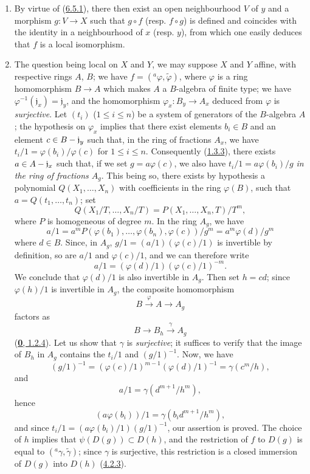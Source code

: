 \begin{enumerate}
  \item[(ii)] By virtue of (\hyperref[I.6.5.1]{6.5.1}), there then exist an
    open neighbourhood $V$ of $y$ and a morphism $g:V\to X$ such that
    $g\circ f$ (resp. $f\circ g$) is defined and coincides with the identity in
    a neighbourhood of $x$ (resp. $y$), from which one easily deduces that $f$
    is a local isomorphism.
  \item[(i)] The question being local on $X$ and $Y$, we may suppose $X$ and
    $Y$ affine, with respective rings $A$, $B$; we have
    $f=({}^a\varphi,\widetilde{\varphi})$, where $\varphi$ is a ring
    homomorphism $B\to A$ which makes $A$ a $B$-algebra of finite type; we have
    $\varphi^{-1}(\mathfrak{j}_x)=\mathfrak{j}_y$, and the homomorphism
    $\varphi_x:B_y\to A_x$ deduced from $\varphi$ is \emph{surjective}. Let $(t_i)$
    ($1\leq i\leq n$) be a system of generators of the $B$-algebra $A$;
    the hypothesis on $\varphi_x$ implies that there exist elements $b_i\in B$
    and an element $c\in B-\mathfrak{j}_y$ such that, in the ring of fractions
    $A_x$, we have $t_i/1=\varphi(b_i)/\varphi(c)$ for $1\leq i\leq n$.
    Consequently (\hyperref[I.1.3.3]{1.3.3}), there exists
    $a\in A-\mathfrak{j}_x$ such that, if we set $g=a\varphi(c)$, we also have
    $t_i/1=a\varphi(b_i)/g$ \emph{in the ring of fractions $A_g$}. This being
    so, there exists by hypothesis a polynomial $Q(X_1,\ldots,X_n)$ with
    coefficients in the ring $\varphi(B)$,
    such that $a=Q(t_1,\ldots,t_n)$; set
    \[
      Q(X_1/T,\ldots,X_n/T)
      =P(X_1,\ldots,X_n,T)/T^m,
    \]
    where $P$ is homogeneous of degree $m$. In the ring $A_g$, we have
    \[
      a/1
      =a^mP(\varphi(b_1),\ldots,\varphi(b_n),\varphi(c))/g^m
      =a^m\varphi(d)/g^m
    \]
    where $d\in B$. Since, in $A_g$,
    $g/1=(a/1)(\varphi(c)/1)$ is invertible by definition, so are $a/1$ and
    $\varphi(c)/1$, and we can therefore write
    \[
      a/1=(\varphi(d)/1)(\varphi(c)/1)^{-m}.
    \]
    We conclude that $\varphi(d)/1$ is also invertible in $A_g$. Then set
    $h=cd$; since $\varphi(h)/1$ is invertible in $A_g$,
    the composite homomorphism
    \[
      B\xrightarrow{\varphi}A\longrightarrow A_g
    \]
    factors as
    \[
      B\longrightarrow B_h\xrightarrow{\gamma}A_g
    \]
    (\hyperref[0.1.2.4]{\textbf{0}, 1.2.4}). Let us show that $\gamma$ is
    \emph{surjective}; it suffices to verify that the image of $B_h$ in $A_g$
    contains the $t_i/1$ and $(g/1)^{-1}$. Now, we have
    \[
      (g/1)^{-1}
      =(\varphi(c)/1)^{m-1}(\varphi(d)/1)^{-1}
      =\gamma(c^m/h),
    \]
    and
    \[
      a/1=\gamma(d^{m+1}/h^m),
    \]
    hence
    \[
      (a\varphi(b_i))/1=\gamma(b_i d^{m+1}/h^m),
    \]
    and since
    $t_i/1=(a\varphi(b_i)/1)(g/1)^{-1}$, our assertion is proved. The
    choice of $h$ implies that $\psi(D(g))\subset D(h)$, and the restriction of
    $f$ to $D(g)$ is equal to
    $({}^a\gamma,\widetilde{\gamma})$; since $\gamma$ is surjective, this
    restriction is a closed immersion of $D(g)$ into $D(h)$
    (\hyperref[I.4.2.3]{4.2.3}).
\end{enumerate}

